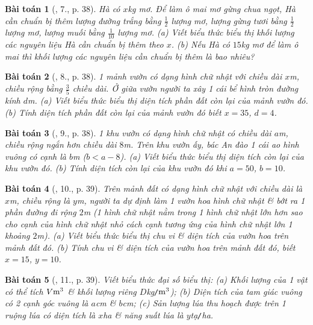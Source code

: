 \documentclass{article}
\newtheorem{baitoan}{Bài toán}
\begin{document}
\begin{baitoan}[\cite{SBT_Toan_7_Canh_Dieu_tap_2}, 7., p. 38]
	Hà có $x$\emph{kg} mơ. Để làm ô mai mơ gừng chua ngọt, Hà cần chuẩn bị thêm lượng đường trắng bằng $\frac{1}{2}$ lượng mơ, lượng gừng tươi bằng $\frac{1}{2}$ lượng mơ, lượng muối bằng $\frac{1}{10}$ lượng mơ. (a) Viết biểu thức biểu thị khối lượng các nguyên liệu Hà cần chuẩn bị thêm theo $x$. (b) Nếu Hà có $15$\emph{kg} mơ để làm ô mai thì khối lượng các nguyên liệu cần chuẩn bị thêm là bao nhiêu?
\end{baitoan}

\begin{baitoan}[\cite{SBT_Toan_7_Canh_Dieu_tap_2}, 8., p. 38]
	1 mảnh vườn có dạng hình chữ nhật với chiều dài $x$\emph{m}, chiều rộng bằng $\frac{3}{5}$ chiều dài. Ở giữa vườn người ta xây 1 cái bể hình tròn đường kính $d$\emph{m}. (a) Viết biểu thức biểu thị diện tích phần đất còn lại của mảnh vườn đó. (b) Tính diện tích phần đất còn lại của mảnh vườn đó biết $x = 35$, $d = 4$.
\end{baitoan}

\begin{baitoan}[\cite{SBT_Toan_7_Canh_Dieu_tap_2}, 9., p. 38]
	1 khu vườn có dạng hình chữ nhật có chiều dài $a$\emph{m}, chiều rộng ngắn hơn chiều dài $8$\emph{m}. Trên khu vườn ấy, bác An đào 1 cái ao hình vuông có cạnh là $b$\emph{m} ($b < a - 8$). (a) Viết biểu thức biểu thị diện tích còn lại của khu vườn đó. (b) Tính diện tích còn lại của khu vườn đó khi $a = 50$, $b = 10$.
\end{baitoan}

\begin{baitoan}[\cite{SBT_Toan_7_Canh_Dieu_tap_2}, 10., p. 39]
	Trên mảnh đất có dạng hình chữ nhật với chiều dài là $x$\emph{m}, chiều rộng là $y$\emph{m}, người ta dự định làm 1 vườn hoa hình chữ nhật \& bớt ra 1 phần đường đi rộng $2$\emph{m} (1 hình chữ nhật nằm trong 1 hình chữ nhật lớn hơn sao cho cạnh của hình chữ nhật nhỏ cách cạnh tương ứng của hình chữ nhật lớn 1 khoảng $2$\emph{m}). (a) Viết biểu thức biểu thị chu vi \& diện tích của vườn hoa trên mảnh đất đó. (b) Tính chu vi \& diện tích của vườn hoa trên mảnh đất đó, biết $x = 15$, $y = 10$.
\end{baitoan}

\begin{baitoan}[\cite{SBT_Toan_7_Canh_Dieu_tap_2}, 11., p. 39]
	Viết biểu thức đại số biểu thị: (a) Khối lượng của 1 vật có thể tích $V{\rm m}^3$ \& khối lượng riêng $D$\emph{kg\texttt{/}$\rm m^3$}); (b) Diện tích của tam giác vuông có 2 cạnh góc vuông là $a$\emph{cm} \& $b$\emph{cm}; (c) Sản lượng lúa thu hoạch được trên 1 ruộng lúa có diện tích là $x$\emph{ha} \& năng suất lúa là $y$\emph{tạ\texttt{/}ha}.
\end{baitoan}
\end{document}
